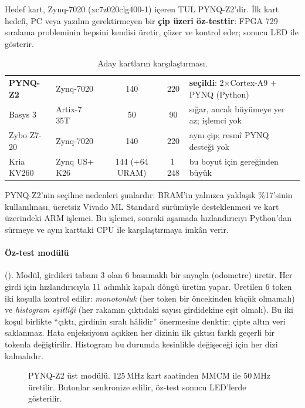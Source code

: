 Hedef kart, Zynq-7020 (xc7z020clg400-1) içeren TUL PYNQ-Z2'dir. İlk kart hedefi, PC veya yazılım gerektirmeyen bir \textbf{çip üzeri öz-testtir}: FPGA 729 sıralama probleminin hepsini kendisi üretir, çözer ve kontrol eder; sonucu LED ile gösterir.

\begin{table}[h]
  \centering\small
  \caption{Aday kartların karşılaştırması.}
  \label{tab:kart}
  \begin{tabularx}{\textwidth}{@{}llccL@{}}
    \toprule
     &  &  &  &  \\ \midrule
    \textbf{PYNQ-Z2} & Zynq-7020 & 140 & 220 & \textbf{seçildi}: 2$\times$Cortex-A9 + PYNQ (Python) \\
    Basys 3 & Artix-7 35T & 50 & 90 & sığar, ancak büyümeye yer az; işlemci yok \\
    Zybo Z7-20 & Zynq-7020 & 140 & 220 & aynı çip; resmî PYNQ desteği yok \\
    Kria KV260 & Zynq US+ K26 & 144 (+64 URAM) & 1\,248 & bu boyut için gereğinden büyük \\ \bottomrule
  \end{tabularx}
\end{table}

PYNQ-Z2'nin seçilme nedenleri şunlardır: BRAM'in yalnızca yaklaşık \%17'sinin kullanılması, ücretsiz Vivado ML Standard sürümüyle desteklenmesi ve kart üzerindeki ARM işlemci. Bu işlemci, sonraki aşamada hızlandırıcıyı Python'dan sürmeye ve aynı karttaki CPU ile karşılaştırmaya imkân verir.

\paragraph{Öz-test modülü} (). Modül, girdileri tabanı 3 olan 6 basamaklı bir sayaçla (odometre) üretir. Her girdi için hızlandırıcıyla 11 adımlık kapalı döngü üretim yapar. Üretilen 6 token iki koşulla kontrol edilir: \emph{monotonluk} (her token bir öncekinden küçük olmamalı) ve \emph{histogram eşitliği} (her rakamın çıktıdaki sayısı girdidekine eşit olmalı). Bu iki koşul birlikte ``çıktı, girdinin sıralı hâlidir'' önermesine denktir; çipte altın veri saklanmaz. Hata enjeksiyonu açıkken her dizinin ilk çıktısı farklı geçerli bir tokenla değiştirilir. Histogram bu durumda kesinlikle değişeceği için her dizi kalmalıdır.

\begin{figure}[h]
  \centering
  \caption[PYNQ-Z2 üst modülü]{PYNQ-Z2 üst modülü. 125\,MHz kart saatinden MMCM ile 50\,MHz üretilir. Butonlar senkronize edilir, öz-test sonucu LED'lerde gösterilir.}
  \label{fig:pynq}
\end{figure}

